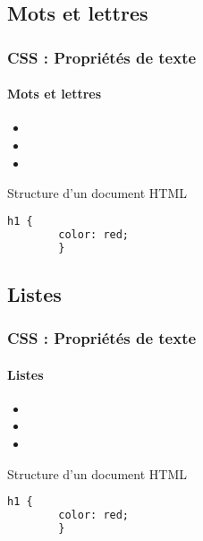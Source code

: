 \documentclass[xcolor=table]{beamer}
\begin{document}
\subsection{Mots et lettres}

\begin{frame}[fragile]
\frametitle{CSS : Propriétés de texte}
\framesubtitle{Mots et lettres}

\begin{minipage}{0.60\textwidth}
	\begin{itemize}
		\item {}
		\item {}
		\item {}
	\end{itemize}
\end{minipage}
%
\begin{minipage}{0.38\textwidth}
	\begin{exampleblock}{Structure d'un document HTML}
		\lstset{escapeinside=**}
		\scriptsize\bfseries
		\begin{lstlisting}[language={html}]
		h1 {
		color: red;
		}
		\end{lstlisting}
	\end{exampleblock}
\end{minipage}
\end{frame}

\subsection{Listes}

\begin{frame}[fragile]
\frametitle{CSS : Propriétés de texte}
\framesubtitle{Listes}

\begin{minipage}{0.60\textwidth}
	\begin{itemize}
		\item {}
		\item {}
		\item {}
	\end{itemize}
\end{minipage}
%
\begin{minipage}{0.38\textwidth}
	\begin{exampleblock}{Structure d'un document HTML}
		\lstset{escapeinside=**}
		\scriptsize\bfseries
		\begin{lstlisting}[language={html}]
		h1 {
		color: red;
		}
		\end{lstlisting}
	\end{exampleblock}
\end{minipage}
\end{frame}
\end{document}
